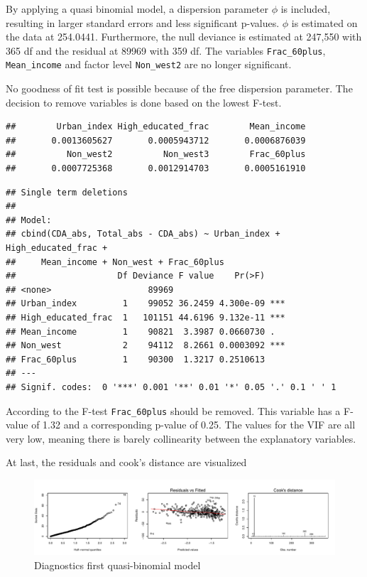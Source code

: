 \documentclass[11pt,]{article}
\begin{document}
By applying a quasi binomial model, a dispersion parameter \(\phi\) is
included, resulting in larger standard errors and less significant
p-values. \(\phi\) is estimated on the data at 254.0441. Furthermore,
the null deviance is estimated at 247,550 with 365 df and the residual
at 89969 with 359 df. The variables \texttt{Frac\_60plus},
\texttt{Mean\_income} and factor level \texttt{Non\_west2} are no longer
significant.

No goodness of fit test is possible because of the free dispersion
parameter. The decision to remove variables is done based on the lowest
F-test.

\begin{verbatim}
##        Urban_index High_educated_frac        Mean_income 
##       0.0013605627       0.0005943712       0.0006876039 
##          Non_west2          Non_west3        Frac_60plus 
##       0.0007725368       0.0012914703       0.0005161910
\end{verbatim}

\begin{verbatim}
## Single term deletions
## 
## Model:
## cbind(CDA_abs, Total_abs - CDA_abs) ~ Urban_index + High_educated_frac + 
##     Mean_income + Non_west + Frac_60plus
##                    Df Deviance F value    Pr(>F)    
## <none>                   89969                      
## Urban_index         1    99052 36.2459 4.300e-09 ***
## High_educated_frac  1   101151 44.6196 9.132e-11 ***
## Mean_income         1    90821  3.3987 0.0660730 .  
## Non_west            2    94112  8.2661 0.0003092 ***
## Frac_60plus         1    90300  1.3217 0.2510613    
## ---
## Signif. codes:  0 '***' 0.001 '**' 0.01 '*' 0.05 '.' 0.1 ' ' 1
\end{verbatim}

According to the F-test \texttt{Frac\_60plus} should be removed. This
variable has a F-value of 1.32 and a corresponding p-value of 0.25. The
values for the VIF are all very low, meaning there is barely
collinearity between the explanatory variables.

At last, the residuals and cook's distance are visualized

\begin{figure}[H]

{\centering \includegraphics{Report_files/figure-latex/unnamed-chunk-16-1} 

}

\caption{\label{ass_mdl2}Diagnostics first quasi-binomial model}\label{fig:unnamed-chunk-16}
\end{figure}
\end{document}
